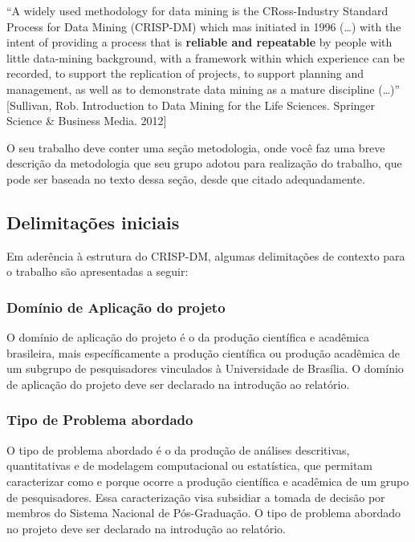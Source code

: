 \documentclass[]{article}
\begin{document}
``A widely used methodology for data mining is the CRoss-Industry
Standard Process for Data Mining (CRISP-DM) which mas initiated in 1996
(\ldots{}) with the intent of providing a process that is
\textbf{reliable and repeatable} by people with little data-mining
background, with a framework within which experience can be recorded, to
support the replication of projects, to support planning and management,
as well as to demonstrate data mining as a mature discipline
(\ldots{})'' {[}Sullivan, Rob. Introduction to Data Mining for the Life
Sciences. Springer Science \& Business Media. 2012{]}

O seu trabalho deve conter uma seção metodologia, onde você faz uma
breve descrição da metodologia que seu grupo adotou para realização do
trabalho, que pode ser baseada no texto dessa seção, desde que citado
adequadamente.

\subsection{Delimitações iniciais}\label{delimitacoes-iniciais}

Em aderência à estrutura do CRISP-DM, algumas delimitações de contexto
para o trabalho são apresentadas a seguir:

\subsubsection{Domínio de Aplicação do
projeto}\label{dominio-de-aplicacao-do-projeto}

O domínio de aplicação do projeto é o da produção científica e acadêmica
brasileira, mais específicamente a produção científica ou produção
acadêmica de um subgrupo de pesquisadores vinculados à Universidade de
Brasília. O domínio de aplicação do projeto deve ser declarado na
introdução ao relatório.

\subsubsection{Tipo de Problema
abordado}\label{tipo-de-problema-abordado}

O tipo de problema abordado é o da produção de análises descritivas,
quantitativas e de modelagem computacional ou estatística, que permitam
caracterizar como e porque ocorre a produção científica e acadêmica de
um grupo de pesquisadores. Essa caracterização visa subsidiar a tomada
de decisão por membros do Sistema Nacional de Pós-Graduação. O tipo de
problema abordado no projeto deve ser declarado na introdução ao
relatório.
\end{document}
